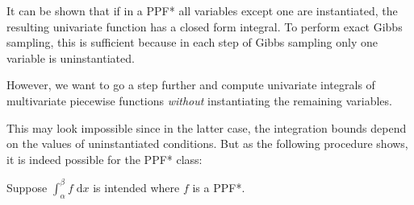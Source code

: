 \documentclass[]{article}
\newcommand{\dd}{\;\mathrm{d}} %
\begin{document}
It can be shown that if in a PPF* all variables except one are instantiated, 
the resulting univariate function has a closed form integral.  
To perform exact Gibbs sampling, this is sufficient because in each step of Gibbs sampling only one variable is uninstantiated.

However, we want to go a step further and compute univariate integrals of multivariate piecewise functions  
\emph{without} instantiating the remaining variables.

This may look impossible since in the latter case, the integration bounds depend on the values of uninstantiated conditions. 
But as the following procedure shows, it is indeed possible for the PPF* class: 

Suppose $\int_{\alpha}^\beta f \dd x$ is intended where $f$ is a PPF*.
\end{document}
